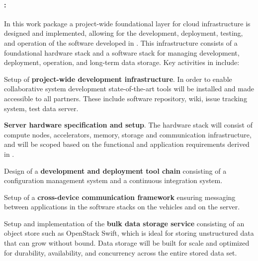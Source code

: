 \paragraph{\textbf{\WPCloud: \WPCloudTitle}}
In this work package a project-wide foundational layer for cloud infrastructure is designed and implemented, allowing for the development, deployment, testing, and operation of the software developed in \Project. This infrastructure consists of a foundational hardware stack and a software stack for managing development, deployment, operation, and long-term data storage. Key activities in \WPCloud include:
\begin{denseItemize}
\item Setup of \textbf{project-wide development infrastructure}. In order to enable collaborative system development state-of-the-art tools will be installed and made accessible to all partners. These include software repository, wiki, issue tracking system, test data server.
\item \textbf{Server hardware specification and setup}. The hardware stack will consist of compute nodes, accelerators, memory, storage
  and communication infrastructure, and will be scoped based on the functional
  and application requirements derived in \WPSpecification.
\item Design of a \textbf{development and deployment tool chain} consisting of a configuration management system and a continuous integration system.
\item Setup of a \textbf{cross-device communication framework} ensuring messaging between applications in the software stacks on the vehicles
  and on the server.
\item Setup and implementation of the \textbf{bulk data storage service} consisting of an object store such as OpenStack Swift, which is ideal for storing unstructured data that can grow without bound. Data storage will be built for scale and optimized for durability, availability, and concurrency across the entire stored data set.
\end{denseItemize}

